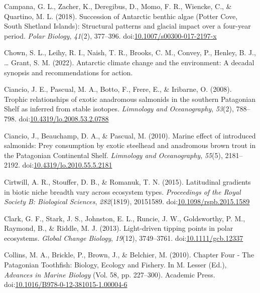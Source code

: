 \documentclass[
]{article}
\newlength{\cslhangindent}
\newlength{\cslentryspacingunit} %
\newenvironment{CSLReferences}[2] %
 {%
  \setlength{\parindent}{0pt}
  \ifodd #1
  \let\oldpar\par
  \def\par{\hangindent=\cslhangindent\oldpar}
  \fi
  \setlength{\parskip}{#2\cslentryspacingunit}
 }%
 {}
\begin{document}
\begin{CSLReferences}{1}{0}
\leavevmode{}%
Campana, G. L., Zacher, K., Deregibus, D., Momo, F. R., Wiencke, C., \&
Quartino, M. L. (2018). Succession of {Antarctic} benthic algae ({Potter
Cove}, {South Shetland Islands}): Structural patterns and glacial impact
over a four-year period. \emph{Polar Biology}, \emph{41}(2), 377--396.
doi:\href{https://doi.org/10.1007/s00300-017-2197-x}{10.1007/s00300-017-2197-x}

\leavevmode{}%
Chown, S. L., Leihy, R. I., Naish, T. R., Brooks, C. M., Convey, P.,
Henley, B. J., \ldots{} Grant, S. M. (2022). Antarctic climate change
and the environment: A decadal synopsis and recommendations for action.

\leavevmode{}%
Ciancio, J. E., Pascual, M. A., Botto, F., Frere, E., \& Iribarne, O.
(2008). Trophic relationships of exotic anadromous salmonids in the
southern {Patagonian Shelf} as inferred from stable isotopes.
\emph{Limnology and Oceanography}, \emph{53}(2), 788--798.
doi:\href{https://doi.org/10.4319/lo.2008.53.2.0788}{10.4319/lo.2008.53.2.0788}

\leavevmode{}%
Ciancio, J., Beauchamp, D. A., \& Pascual, M. (2010). Marine effect of
introduced salmonids: {Prey} consumption by exotic steelhead and
anadromous brown trout in the {Patagonian Continental Shelf}.
\emph{Limnology and Oceanography}, \emph{55}(5), 2181--2192.
doi:\href{https://doi.org/10.4319/lo.2010.55.5.2181}{10.4319/lo.2010.55.5.2181}

\leavevmode{}%
Cirtwill, A. R., Stouffer, D. B., \& Romanuk, T. N. (2015). Latitudinal
gradients in biotic niche breadth vary across ecosystem types.
\emph{Proceedings of the Royal Society B: Biological Sciences},
\emph{282}(1819), 20151589.
doi:\href{https://doi.org/10.1098/rspb.2015.1589}{10.1098/rspb.2015.1589}

\leavevmode{}%
Clark, G. F., Stark, J. S., Johnston, E. L., Runcie, J. W., Goldsworthy,
P. M., Raymond, B., \& Riddle, M. J. (2013). Light-driven tipping points
in polar ecosystems. \emph{Global Change Biology}, \emph{19}(12),
3749--3761.
doi:\href{https://doi.org/10.1111/gcb.12337}{10.1111/gcb.12337}

\leavevmode{}%
Collins, M. A., Brickle, P., Brown, J., \& Belchier, M. (2010). Chapter
{Four} - {The Patagonian Toothfish}: {Biology}, {Ecology} and {Fishery}.
In M. Lesser (Ed.), \emph{Advances in {Marine Biology}} (Vol. 58, pp.
227--300). {Academic Press}.
doi:\href{https://doi.org/10.1016/B978-0-12-381015-1.00004-6}{10.1016/B978-0-12-381015-1.00004-6}


\end{CSLReferences}
\end{document}
